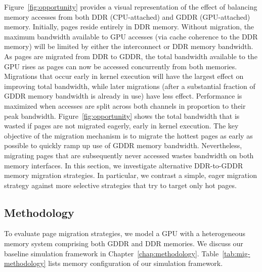 Figure~\ref{fig:opportunity} provides a visual representation of the effect of
balancing memory accesses from both DDR (CPU-attached) and GDDR (GPU-attached)
memory. Initially, pages reside entirely in DDR memory.  Without migration, the
maximum bandwidth available to GPU accesses (via cache coherence to the DDR
memory)  will be limited by either the interconnect or DDR memory bandwidth.  As
pages are migrated from DDR to GDDR, the total bandwidth available to the GPU
rises as pages can now be accessed concurrently from both memories.  Migrations
that occur early in kernel execution will have the largest effect on improving
total bandwidth, while later migrations (after a substantial fraction of GDDR
memory bandwidth is already in use) have less effect.  Performance is maximized
when accesses are split across both channels in proportion to their peak
bandwidth.  Figure~\ref{fig:opportunity} shows the total bandwidth that is
wasted if pages are not migrated eagerly, early in kernel execution.  The key
objective of the migration mechanism is to migrate the hottest pages as early as
possible to quickly ramp up use of GDDR memory bandwidth.  Nevertheless,
migrating pages that are subsequently never accessed wastes bandwidth on both
memory interfaces.  In this section, we investigate alternative DDR-to-GDDR
memory migration strategies.  In particular, we contrast a simple, eager
migration strategy against more selective strategies that try to target only hot
pages.

\subsection{Methodology}
To evaluate page migration strategies, we model a GPU with a heterogeneous
memory system comprising both  GDDR and DDR memories. We discuss our baseline
simulation framework in Chapter~\ref{chap:methodology}.
%
Table~\ref{tab:mig-methodology} lists memory configuration of our simulation
framework.

